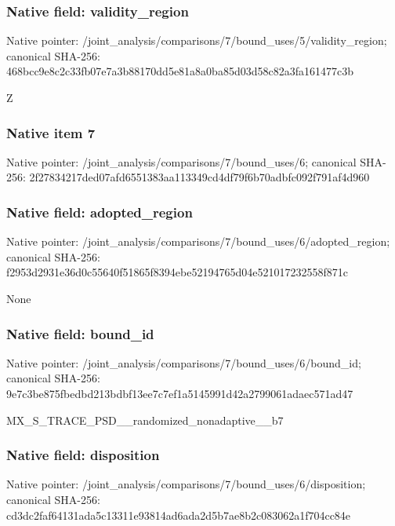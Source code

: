 \documentclass[10pt,a4paper]{article}
\begin{document}
\subsubsection{Native field: validity\_\allowbreak{}region}
Native pointer: /joint\_\allowbreak{}analysis/comparisons/7/bound\_\allowbreak{}uses/5/validity\_\allowbreak{}region; canonical SHA-256: 468bcc9e8c2c33fb07e7a3b88170dd5e81a8a0ba85d03d58c82a3fa161477c3b

\begingroup\raggedright\sloppy Z\par\endgroup

\subsubsection{Native item 7}
Native pointer: /joint\_\allowbreak{}analysis/comparisons/7/bound\_\allowbreak{}uses/6; canonical SHA-256: 2f27834217ded07afd6551383aa113349cd4df79f6b70adbfc092f791af4d960

\subsubsection{Native field: adopted\_\allowbreak{}region}
Native pointer: /joint\_\allowbreak{}analysis/comparisons/7/bound\_\allowbreak{}uses/6/adopted\_\allowbreak{}region; canonical SHA-256: f2953d2931e36d0c55640f51865f8394ebe52194765d04e521017232558f871c

\begingroup\raggedright\sloppy None\par\endgroup

\subsubsection{Native field: bound\_\allowbreak{}id}
Native pointer: /joint\_\allowbreak{}analysis/comparisons/7/bound\_\allowbreak{}uses/6/bound\_\allowbreak{}id; canonical SHA-256: 9e7c3be875fbedbd213bdbf13ee7c7ef1a5145991d42a2799061adaec571ad47

\begingroup\raggedright\sloppy MX\_\allowbreak{}S\_\allowbreak{}TRACE\_\allowbreak{}PSD\_\allowbreak{}\_\allowbreak{}randomized\_\allowbreak{}nonadaptive\_\allowbreak{}\_\allowbreak{}b7\par\endgroup

\subsubsection{Native field: disposition}
Native pointer: /joint\_\allowbreak{}analysis/comparisons/7/bound\_\allowbreak{}uses/6/disposition; canonical SHA-256: cd3dc2faf64131ada5c13311e93814ad6ada2d5b7ae8b2c083062a1f704cc84e
\end{document}
